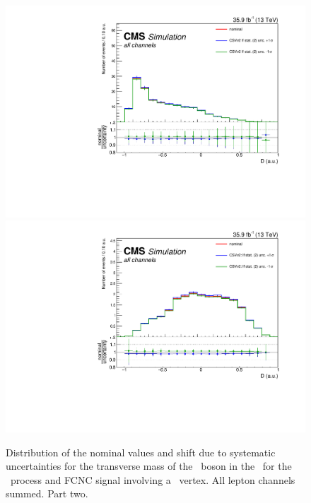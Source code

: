 \begin{figure}[htbp]
{		\includegraphics[width=0.2\linewidth]{6_Search/Figures/SystematicEffect/toppairzut/btagSF_lfstats2BKG}
		\includegraphics[width=0.2\linewidth]{6_Search/Figures/SystematicEffect/toppairzut/btagSF_lfstats2SIG}
	}
	\caption{Distribution of the nominal values and shift due to systematic uncertainties for the transverse mass of the \PW\ boson in the \TTSR\ for the \WZ\ process and FCNC signal involving a \Zut\ vertex. All lepton channels summed. Part two.}
	\label{fig:shiftBDTTTZut}
\end{figure}
\newpage
